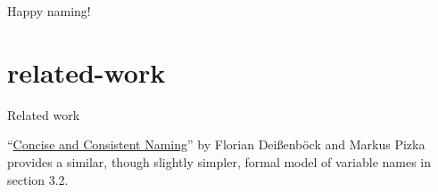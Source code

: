 \documentclass{article}
\begin{document}
Happy naming!

\section{related-work}{Related work}

``\href{https://teamscale.com/hubfs/26978363/Publications/2005-concise-and-consistent-naming.pdf}{Concise and Consistent Naming}'' by Florian Deißenböck and Markus Pizka provides a similar, though slightly simpler, formal model of variable names in section 3.2.
\end{document}
